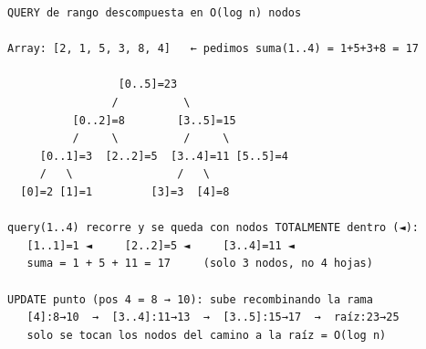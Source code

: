 \begin{dsacomofunciona}
\begin{verbatim}
QUERY de rango descompuesta en O(log n) nodos

Array: [2, 1, 5, 3, 8, 4]   ← pedimos suma(1..4) = 1+5+3+8 = 17

                 [0..5]=23
                /          \
          [0..2]=8        [3..5]=15
          /     \          /     \
     [0..1]=3  [2..2]=5  [3..4]=11 [5..5]=4
     /   \                /   \
  [0]=2 [1]=1         [3]=3  [4]=8

query(1..4) recorre y se queda con nodos TOTALMENTE dentro (◄):
   [1..1]=1 ◄     [2..2]=5 ◄     [3..4]=11 ◄
   suma = 1 + 5 + 11 = 17     (solo 3 nodos, no 4 hojas)

UPDATE punto (pos 4 = 8 → 10): sube recombinando la rama
   [4]:8→10  →  [3..4]:11→13  →  [3..5]:15→17  →  raíz:23→25
   solo se tocan los nodos del camino a la raíz = O(log n)
\end{verbatim}
\end{dsacomofunciona}

